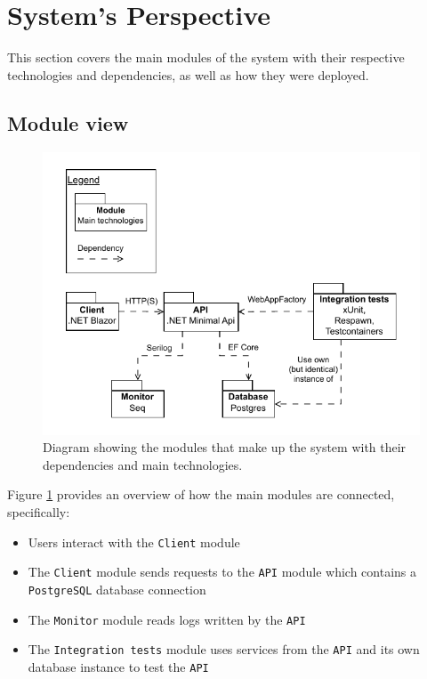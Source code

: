 \section{System's Perspective}
\label{ch:sys_persp} %

This section covers the main modules of the system with their  
respective technologies and dependencies, as well as how they
were deployed.

\subsection{Module view}
\begin{figure}[H]
    \centering
    \includegraphics[width=\linewidth]{images/modules.drawio.pdf}
    \caption{Diagram showing the modules that make up the system with
    their dependencies and main technologies.}
    \label{fig:modules}
\end{figure}
Figure \ref{fig:modules} provides an overview of how the main modules are connected, specifically:
\begin{itemize}
    \item Users interact with the \texttt{Client} module
    \item The \texttt{Client} module sends requests to the \texttt{API} module which contains a \texttt{PostgreSQL} database connection
    \item The \texttt{Monitor} module reads logs written by the \texttt{API}
    \item The \texttt{Integration tests} module uses services from the \texttt{API} and its own database instance to test the \texttt{API}
\end{itemize}


